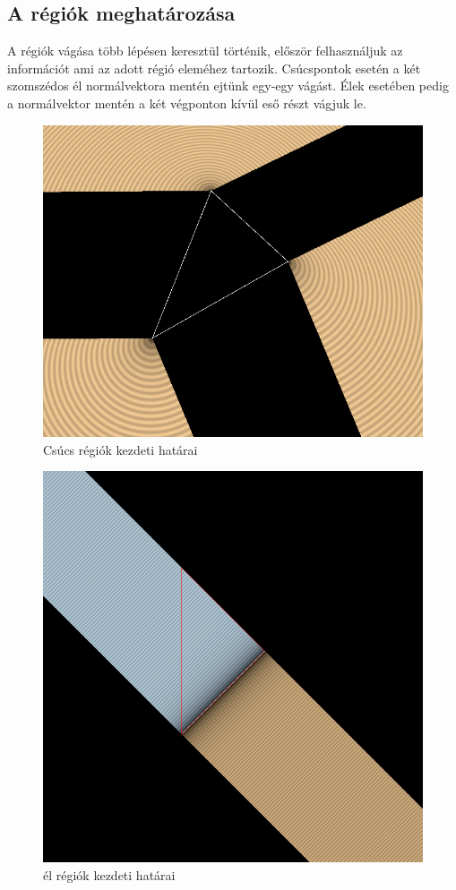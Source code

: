 \subsection{A régiók meghatározása}

A régiók vágása több lépésen keresztül történik, először felhasználjuk az információt ami az adott régió eleméhez tartozik. Csúcspontok esetén a két szomszédos él normálvektora mentén ejtünk egy-egy vágást. Élek esetében pedig a normálvektor mentén a két végponton kívül eső részt vágjuk le.

\begin{figure}[H]
    \centering
    \includegraphics[width=.6\linewidth]{images/initial_vertex_regions.png}
    \caption{Csúcs régiók kezdeti határai}
    \label{fig:initial_vertex_regions-1}
\end{figure}

\begin{figure}[H]
    \centering
    \includegraphics[width=.6\linewidth]{images/initial_segment_regions.png}
    \caption{él régiók kezdeti határai}
    \label{fig:initial_segment_regions-1}
\end{figure}

